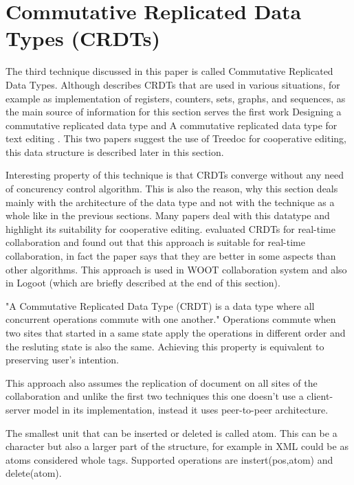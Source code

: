 \documentclass[12pt,oneside]{fithesis2}
\begin{document}
\section{Commutative Replicated Data Types (CRDTs)}
\par The third technique discussed in this paper is called Commutative Replicated Data Types. Although \cite{Shapiro-long} describes CRDTs that are used in various situations, for example as implementation of registers, counters, sets, graphs, and sequences, as the main source of information for this section serves the first work Designing a commutative replicated data type \cite{Shapiro-design} and A commutative replicated data type for text editing \cite{Shapiro-editing}. This two papers suggest the use of Treedoc for cooperative editing, this data structure is described later in this section. 
\par Interesting property of this technique is that CRDTs converge without any need of concurency control algorithm. This is also the reason, why this section deals mainly with the architecture of the data type and not with the technique as a whole like in the previous sections. Many papers deal with this datatype and highlight its suitability for cooperative editing. \cite{CRDT-real} evaluated CRDTs for real-time collaboration and found out that this approach is suitable for real-time collaboration, in fact the paper says that they are better in some aspects than other algorithms. This approach is used in WOOT collaboration system \cite{WOOT} and also in Logoot \cite{Logoot} (which are briefly described at the end of this section). 
\par "A Commutative Replicated Data Type (CRDT) is a data type where all concurrent operations commute with one another." \cite{Shapiro-design} Operations commute when two sites that started in a same state apply the operations in different order and the resluting state is also the same. Achieving this property is equivalent to preserving user's intention.
\par This approach also assumes the replication of document on all sites of the collaboration and unlike the first two techniques this one doesn't use a client-server model in its implementation, instead it uses peer-to-peer architecture.
\par The smallest unit that can be inserted or deleted is called atom. This can be a character but also a larger part of the structure, for example in XML could be as atoms considered whole tags. Supported operations are instert(pos,atom) and delete(atom). 
\end{document}
